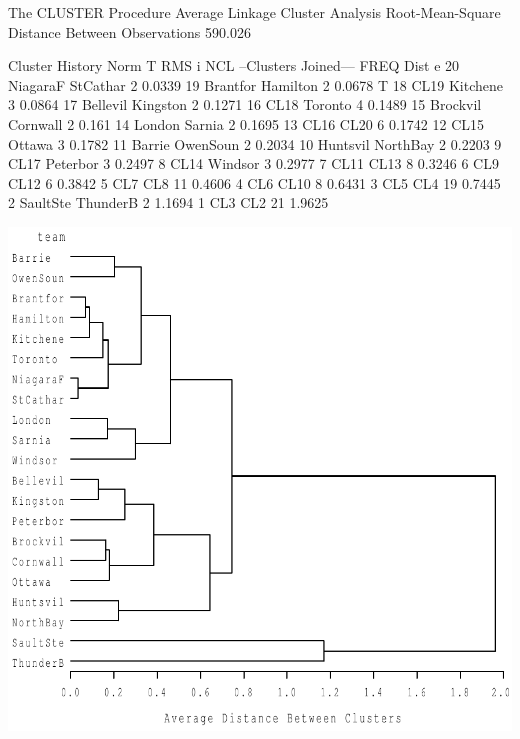\documentclass{article}
\begin{document}
\begin{Woutput}
The CLUSTER Procedure
Average Linkage Cluster Analysis
Root-Mean-Square Distance Between Observations     590.026

                    Cluster History
                                              Norm    T
                                               RMS    i
   NCL    --Clusters Joined---      FREQ      Dist    e
    20    NiagaraF    StCathar         2    0.0339
    19    Brantfor    Hamilton         2    0.0678    T
    18    CL19        Kitchene         3    0.0864
    17    Bellevil    Kingston         2    0.1271
    16    CL18        Toronto          4    0.1489
    15    Brockvil    Cornwall         2     0.161
    14    London      Sarnia           2    0.1695
    13    CL16        CL20             6    0.1742
    12    CL15        Ottawa           3    0.1782
    11    Barrie      OwenSoun         2    0.2034
    10    Huntsvil    NorthBay         2    0.2203
     9    CL17        Peterbor         3    0.2497
     8    CL14        Windsor          3    0.2977
     7    CL11        CL13             8    0.3246
     6    CL9         CL12             6    0.3842
     5    CL7         CL8             11    0.4606
     4    CL6         CL10             8    0.6431
     3    CL5         CL4             19    0.7445
     2    SaultSte    ThunderB         2    1.1694
     1    CL3         CL2             21    1.9625
\end{Woutput}
\includegraphics[]{ontario-road-distances-1-SAS-fig.pdf}
\end{document}
